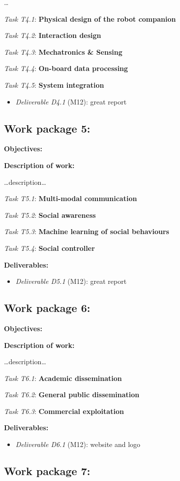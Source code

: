\documentclass[11pt]{report}
\newcommand{\task}[2]{\vspace{0.5cm}\noindent\emph{Task T#1}: {\bf #2}\par}
\newcommand{\D}[3]{\emph{Deliverable D#1} (M#2): #3\\}
\begin{document}
\ldots{}

\task{4.1}{Physical design of the robot companion}
\task{4.2}{Interaction design}
\task{4.3}{Mechatronics \& Sensing}
\task{4.4}{On-board data processing}
\task{4.5}{System integration}

\begin{itemize}
    \item \D{4.1}{12}{great report}
\end{itemize}

\subsection{Work package 5: \wpFive}


\textbf{Objectives:}

\textbf{Description of work:}

\ldots{}description\ldots{}

\task{5.1}{Multi-modal communication}
\task{5.2}{Social awareness}
\task{5.3}{Machine learning of social behaviours}
\task{5.4}{Social controller}

\vspace{0.5cm}\textbf{Deliverables:}

\begin{itemize}
    \item \D{5.1}{12}{great report}
\end{itemize}

\subsection{Work package 6: \wpSix}


\textbf{Objectives:}

\textbf{Description of work:}

\ldots{}description\ldots{}

\task{6.1}{Academic dissemination}
\task{6.2}{General public dissemination}
\task{6.3}{Commercial exploitation}

\vspace{0.5cm}\textbf{Deliverables:}

\begin{itemize}
    \item \D{6.1}{12}{website and logo}
\end{itemize}

\subsection{Work package 7: \wpSeven}
\end{document}
